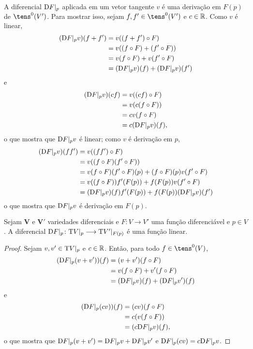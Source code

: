 A diferencial $\mathrm{D} F|_p$ aplicada em um vetor tangente $v$ é uma derivação em $F(p)$ de $\tens^0(V')$. Para mostrar isso, sejam $f,f' \in \tens^0(V')$ e $c \in \mathbb{R}$. Como $v$ é linear,
	\begin{align*}
	(\mathrm{D} F|_p v) (f+f') &= v((f + f') \circ F) \\
		&= v((f \circ F) + (f' \circ F)) \\
		&= v(f \circ F) + v(f' \circ F) \\
		&= (\mathrm{D} F|_p v) (f) + (\mathrm{D} F|_p v) (f')
	\end{align*}
e
	\begin{align*}
	(\mathrm{D} F|_p v) (cf) &= v((cf) \circ F) \\
		&= v(c(f \circ F)) \\
		&= cv(f \circ F) \\
		&= c(\mathrm{D} F|_p v) (f),
	\end{align*}
o que mostra que $\mathrm{D} F|_p v$ é linear; como $v$ é derivação em $p$,
	\begin{align*}
	(\mathrm{D} F|_p v) (ff') &= v((ff') \circ F) \\
		&= v((f \circ F)(f' \circ F)) \\
		&= v(f \circ F)(f' \circ F)(p) + (f \circ F)(p)v(f' \circ F) \\
		&= v((f \circ F))f'(F(p)) + f(F(p))v(f' \circ F) \\
		&= (\mathrm{D} F|_p v)(f)f'(F(p)) + f(F(p))(\mathrm{D} F|_p v)(f')
	\end{align*}
o que mostra que $\mathrm{D} F|_p v$ é derivação em $F(p)$.

\begin{prop}
Sejam $\bm V$ e $\bm V'$ variedades diferenciais e $F\colon V \to V'$ uma função diferenciável e $p \in V$. A diferencial $\mathrm{D} F|_p\colon \mathrm{T} V|_p \longrightarrow \mathrm{T} V'|_{F(p)}$ é uma função linear.
\end{prop}
\begin{proof}
Sejam $v,v' \in \mathrm{T} V|_p$ e $c \in \mathbb{R}$. Então, para todo $f \in \tens^0(V)$,
	\begin{align*}
	(\mathrm{D} F|_p (v+v')) (f) &= (v+v')(f \circ F) \\
		&= v(f \circ F) + v'(f \circ F) \\
		&= (\mathrm{D} F|_p v) (f) + (\mathrm{D} F|_p v') (f)
	\end{align*}
e
	\begin{align*}
	(\mathrm{D} F|_p (cv)) (f) &= (cv)(f \circ F) \\
		&= c(v(f \circ F)) \\
		&= (c\mathrm{D} F|_p v) (f),
	\end{align*}
o que mostra que $\mathrm{D} F|_p (v+v') = \mathrm{D} F|_p v + \mathrm{D} F|_p v'$ e $\mathrm{D} F|_p(cv) = c\mathrm{D} F|_p v$.
\end{proof}

